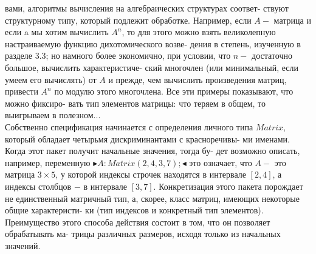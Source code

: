 \documentclass{./git_rep/mai_prac_2017/template/mai_book}
\begin{document}
вами,  алгоритмы  вычисления  на  алгебраических  структурах  соответ­-\linebreak
ствуют  структурному  типу,  который  подлежит  обработке.  Например,\linebreak
если $A-$ матрица и  если a мы хотим вычислить $A^n$,  то  для этого можно\linebreak 
взять  великолепную  настраиваемую  функцию  дихотомического  возве­-\linebreak
дения в степень,  изученную в разделе 3.3; но намного более экономично,\linebreak
при условии,  что $n-$ достаточно большое, вычислить характеристиче-\linebreak
ский  многочлен (или  минимальный,  если  умеем  его  вычислять) от $A$  и\linebreak 
прежде,  чем  вычислить  произведения  матриц,  привести  $A^n$  по  модулю \linebreak
этого  многочлена.  Все  эти  примеры  показывают,  что  можно  фиксиро­-\linebreak
вать  тип  элементов  матрицы:  что  теряем  в  общем,  то  выигрываем  в\linebreak
полезном...\\

Собственно  спецификация  начинается  с  определения  личного  типа\linebreak
$Matrix$, который обладает четырьмя дискриминантами с красноречивы-\linebreak
ми  именами.  Когда этот пакет  получит  начальные значения, тогда бу-\linebreak
дет возможно описать, например, переменную $\blacktriangleright A:Matrix(2,4,3,7);\blacktriangleleft$
это  означает,  что  $A-$ это  матрица  $3\times 5$,  у  которой  индексы  строчек\linebreak 
находятся  в  интервале  $[2,4]$,  а  индексы  столбцов  $-$  в  интервале  $[3,7]$.\linebreak 
Конкретизация  этого  пакета  порождает  не  единственный  матричный\linebreak
тип, а, скорее,  класс матриц, имеющих некоторые общие характеристи-\linebreak
ки  (тип  индексов  и  конкретный  тип  элементов).  Преимущество  этого\linebreak
способа  действия  состоит  в  том,  что  он  позволяет  обрабатывать  ма-\linebreak
трицы  различных  размеров,  исходя  только из  начальных значений.\\
\end{document}
